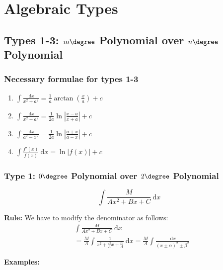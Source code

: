 \section{Algebraic Types}
  \subsection{Types 1-3: $m\degree$ Polynomial over $n\degree$ Polynomial}
    \subsubsection{Necessary formulae for types 1-3}
      \begin{enumerate}
        \item $\int \frac{\ \mathrm{d}x}{x^2 + a^2} = \frac{1}{a} \arctan(\frac{x}{a}) + c$
        \item $\int \frac{\ \mathrm{d}x}{x^2 - a^2}= \frac{1}{2a} \ln |\frac{x-a}{x+a}| + c$
        \item $\int \frac{\ \mathrm{d}x}{a^2 - x^2} = \frac{1}{2a} \ln |\frac{a+x}{a-x}| + c$
        \item $\int \frac{f'(x)}{f(x)} \ \mathrm{d}x = \ln |f(x)| + c$
      \end{enumerate}

    \subsubsection{Type 1: $0\degree$ Polynomial over $2\degree$ Polynomial}
      
      \begin{equation*}
        \int \frac{M}{Ax^2 + Bx + C} \ \mathrm{d}x
      \end{equation*}
      
      \begin{center}
        \textbf{Rule:} We have to modify the denominator as follows: \begin{align*}
          & \int \frac{M}{Ax^2 + Bx + C} \ \mathrm{d}x \\
          & = \frac{M}{A} \int \frac{1}{x^2 + \frac{B}{A} x + \frac{C}{A}} \ \mathrm{d}x
          = \frac{M}{A} \int \frac{\ \mathrm{d}x}{(x \pm \alpha)^2 \pm \beta^2}
        \end{align*}
      \end{center}
      
      \textbf{Examples:} \\
        
